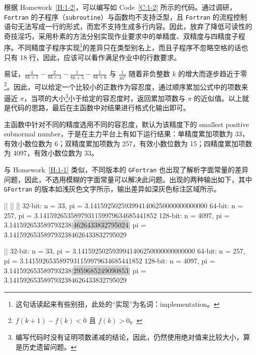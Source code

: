 根据 Homework~\ref{H:1-2}，可以编写如 Code~\ref{C:1-2} 所示的代码。通过调研，\texttt{Fortran} 的子程序（\texttt{subroutine}）与函数均不支持泛型，且 \texttt{Fortran} 的流程控制语句无法写成一行的形式，而宏不支持生成多行内容。因此，放弃了降低可读性的奇技淫巧，采用朴素的方法分别实现作业要求中的单精度、双精度与四精度子程序。不同精度子程序实现\footnote{这句话读起来有些别扭，此处的“实现”为名词：implementation。}的差异只在类型别名上，而且子程序不忽略空格的话也只有 18 行，因此，应该可以看作满足作业中的行数要求。

易证，$\tfrac{4}{8k+1} - \tfrac{2}{8k+4} - \tfrac{1}{8k+5} - \tfrac{1}{8k+6}$ 与 $\tfrac{1}{16^k}$ 随着非负整数 $k$ 的增大而逐步趋近于零\footnote{$f(k+1)-f(k)<0$ 且 $f(k)>0$。}。因此，可以给定一个比较小的正数作为容忍度，通过顺序累加公式中的项数来逼近 $\pi$，当项的大小\footnote{编写代码时没有证明项数递减的结论，因此，仍然使用绝对值来比较大小，算是历史遗留问题。}小于给定的容忍度时，返回累加项数与 $\pi$ 的近似值。以上就是代码的思路，最后在主函数中对结果进行格式化输出即可。

主函数中针对不同的精度选用不同的容忍度，默认为该精度下的 smallest positive subnormal number，于是在主力平台上有如下运行结果：单精度累加项数为 33，有效小数位数为 6；双精度累加项数为 257，有效小数位数为 15；四精度累加项数为 4097，有效小数位数为 33。

与 Homework~\ref{H:1-1} 类似，不同版本的 \texttt{GFortran} 也出现了解析字面常量的差异问题，因此，不选用模糊的字面常量可以解决此问题。出现的两种输出如下，其中 \texttt{GFortran} 的版本如浅灰色文字所示，输出差异如深灰色标注区域所示。

\begin{plaintext}[minted options={numbers=left, gobble=0, escapeinside=||, python3}]
||
||
||
 32-bit: n =   33, pi = 3.1415925025939941406250000000000000
 64-bit: n =  257, pi = 3.1415926535897931159979634685441852
128-bit: n = 4097, pi = 3.141592653589793238|\colorbox{lightgray}{4626433832795024}|
                   pi = 3.1415926535897932384626433832795029
\end{plaintext}

\begin{plaintext}[minted options={numbers=left, gobble=0, escapeinside=||, python3}]
||
 32-bit: n =   33, pi = 3.1415925025939941406250000000000000
 64-bit: n =  257, pi = 3.1415926535897931159979634685441852
128-bit: n = 4097, pi = 3.141592653589793238|\colorbox{lightgray}{2959685249090853}|
                   pi = 3.1415926535897932384626433832795029
\end{plaintext}
